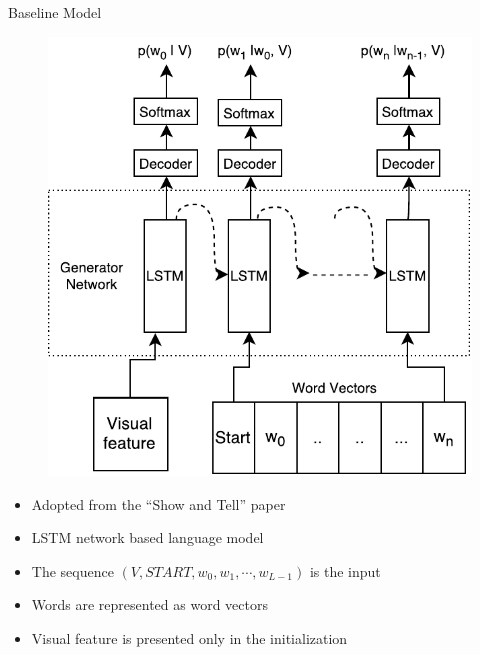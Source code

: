 \documentclass{beamer}
\begin{document}
\begin{frame}{Baseline Model}
    \begin{figure}[h]
        \centering
        \includegraphics[width=0.4\linewidth]{images/Thesis_lstmLangGen.pdf}
    \end{figure}
    \begin{itemize}
        \item Adopted from the ``Show and Tell'' paper~\cite{Vinyals_2015_CVPR} 
        \item LSTM network based language model
        \item The sequence $(V,START,w_0, w_1, \cdots,w_{L-1})$ is the input
        \item Words are represented as word vectors 
        \item Visual feature is presented only in the initialization 
    \end{itemize}
\end{frame}
\end{document}
